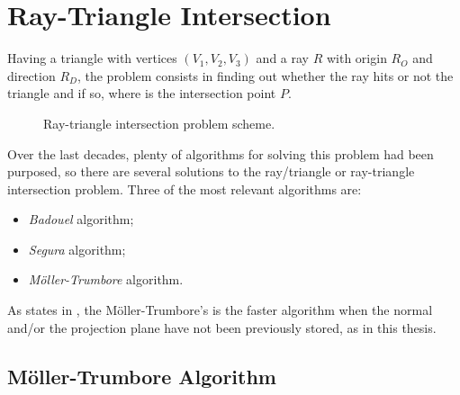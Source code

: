 \section{Ray-Triangle Intersection}
Having a triangle with vertices $(V_1,V_2,V_3)$ and a ray $R$ with origin $R_O$ and direction $R_D$, the problem consists in finding out whether the ray hits or not the triangle and if so, where is the intersection point $P$.
%
\begin{figure}[htbp]
	\centering
	\caption{Ray-triangle intersection problem scheme.}
\end{figure}
%
Over the last decades, plenty of algorithms for solving this problem had been purposed, so there are several solutions to the ray/triangle or ray-triangle intersection problem. Three of the most relevant algorithms are:
\begin{itemize}
	\item \textit{Badouel} algorithm;
	\item \textit{Segura} algorithm;
	\item \textit{M\"oller-Trumbore} algorithm.
\end{itemize}
As \citeauthor{RayTriangle} states in \cite{RayTriangle}, the M\"oller-Trumbore's is the faster algorithm when the normal and/or the projection plane have not been previously stored, as in this thesis.\\
%
\subsection{M\"oller-Trumbore Algorithm}

